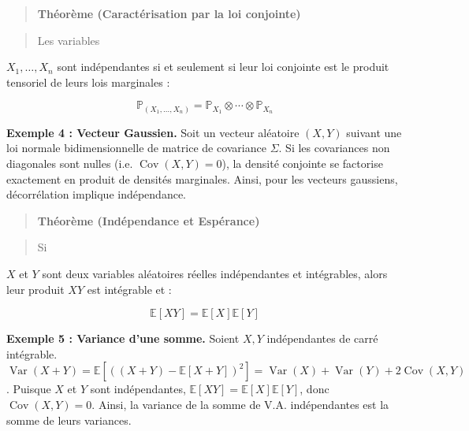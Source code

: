 \documentclass[11pt,a4paper]{article}
\begin{document}
\begin{quote}
\textbf{Théorème (Caractérisation par la loi conjointe)}
\end{quote}
\begin{quote}
Les variables
\end{quote}$X_1, \ldots, X_n$ sont indépendantes si et seulement si leur loi conjointe est le produit tensoriel de leurs lois marginales :
\begin{quote}

\end{quote}$$\mathbb{P}_{(X_1, \ldots, X_n)} = \mathbb{P}_{X_1} \otimes \cdots \otimes \mathbb{P}_{X_n}$$

\textbf{Exemple 4 : Vecteur Gaussien.}
Soit un vecteur aléatoire $(X,Y)$ suivant une loi normale bidimensionnelle de matrice de covariance $\Sigma$. Si les covariances non diagonales sont nulles (i.e. $\operatorname{Cov}(X,Y) = 0$), la densité conjointe se factorise exactement en produit de densités marginales. Ainsi, pour les vecteurs gaussiens, décorrélation implique indépendance.

\begin{quote}
\textbf{Théorème (Indépendance et Espérance)}
\end{quote}
\begin{quote}
Si
\end{quote}$X$ et $Y$ sont deux variables aléatoires réelles indépendantes et intégrables, alors leur produit $XY$ est intégrable et :
\begin{quote}

\end{quote}$$\mathbb{E}[XY] = \mathbb{E}[X]\mathbb{E}[Y]$$

\textbf{Exemple 5 : Variance d'une somme.}
Soient $X, Y$ indépendantes de carré intégrable.
$\operatorname{Var}(X+Y) = \mathbb{E}[((X+Y) - \mathbb{E}[X+Y])^2] = \operatorname{Var}(X) + \operatorname{Var}(Y) + 2\operatorname{Cov}(X,Y)$.
Puisque $X$ et $Y$ sont indépendantes, $\mathbb{E}[XY] = \mathbb{E}[X]\mathbb{E}[Y]$, donc $\operatorname{Cov}(X,Y) = 0$.
Ainsi, la variance de la somme de V.A. indépendantes est la somme de leurs variances.
\end{document}
